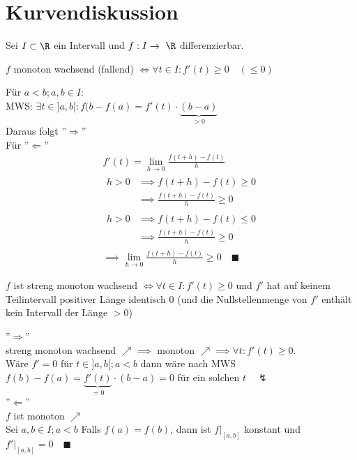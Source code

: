 \section{Kurvendiskussion}
Sei $I \subset \R$ ein Intervall und $f: I \rightarrow \R$ differenzierbar.\\
\begin{beh}
	$f$ monoton wachsend (fallend) $\iff \forall t \in I : f'(t) \geq 0 \quad (\leq 0)$\\
	\begin{bew}
		Für $a < b ; a, b \in I$:\\
		MWS: $\exists t \in ]a,b[ : f(b - f(a) = f'(t) \cdot \underbrace{(b-a)}_{>0}$\\
		Daraus folgt ''$\Rightarrow$'' \\
		Für ''$\Leftarrow$''
		\begin{gather*}
			f'(t) = \lim_{h \rightarrow 0} \frac{f(t+h) - f(t)}{h} \\
			\begin{split}
				h > 0	&\implies f(t+h) - f(t) \geq 0 \\
					&\implies \frac{f(t+h) - f(t)}{h} \geq 0
			\end{split} \\
			\begin{split}
				h > 0	&\implies f(t+h) - f(t) \leq 0 \\
					&\implies \frac{f(t+h) - f(t)}{h} \geq 0
			\end{split} \\
			\implies \lim_{h \rightarrow 0} \frac{f(t+h) - f(t)}{h} \geq 0 \quad \blacksquare
		\end{gather*}
	\end{bew}
\end{beh}
\begin{beh}
	$f$ ist streng monoton wachsend $\iff \forall t \in I : f'(t) \geq 0$ und $f'$ hat auf keinem Teilintervall positiver Länge identisch $0$ (und die Nullstellenmenge von $f'$ enthält kein Intervall der Länge $> 0$) \\
	\begin{bew}
		''$\Rightarrow$'' \\
		streng monoton wachsend $\nearrow \implies$ monoton $\nearrow \implies \forall t : f'(t) \geq 0$.\\
		Wäre $f' = 0$ für $t \in ]a,b[ ; a < b$ dann wäre nach MWS $f(b) - f(a) = \underbrace{f'(t)}_{=0} \cdot (b-a) = 0$ für ein solchen $t \quad \lightning$ \\
		''$\Leftarrow$'' \\
		$f$ ist monoton $\nearrow$ \\
		Sei $a, b \in I ; a < b$ Falls $f(a) = f(b)$, dann ist $f|_{[a,b]}$ konstant und $f'|_{[a,b]} = 0 \quad \blacksquare$
	\end{bew}
\end{beh}
